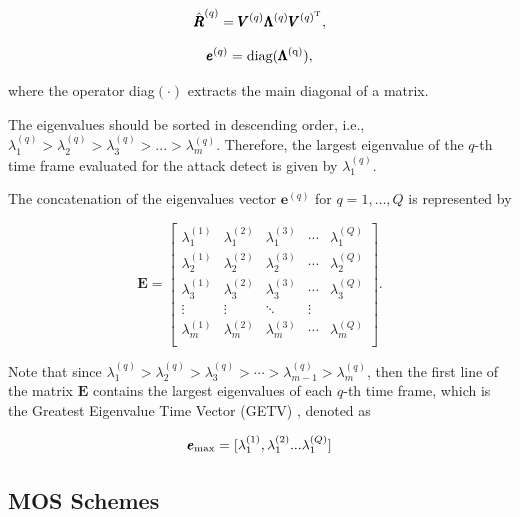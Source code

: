 \begin{equation}\label{eq:2.06}
\hat{\pmb{R}}^{(q)} = \pmb{V}^{(q)}\pmb{\Lambda}^{(q)}\pmb{V}^{(q)^{\rm T}},
\end{equation}

\begin{equation}\label{eq:2.060}
\pmb{e}^{(q)} = \rm diag(\pmb{\Lambda}^{(q)}),
\end{equation}

where the operator diag$(\cdot)$ extracts the main diagonal of a matrix.

The eigenvalues should be sorted in descending order, i.e., $\lambda_{1}^{(q)} > \lambda_{2}^{(q)} > \lambda_{3}^{(q)} > ... > \lambda_{m}^{(q)}$. Therefore, the largest eigenvalue of the $q$-th time frame evaluated for the attack detect is given by $\lambda_{1}^{(q)}$.

The concatenation of the eigenvalues vector $\pmb{e}^{(q)}$ for $q = 1, \ldots, Q$ is represented by

\begin{equation}\label{eq:2.07}
\pmb{E} =
\begin{bmatrix}
  \lambda_1^{(1)} & \lambda_1^{(2)} & \lambda_1^{(3)} & \cdots & \lambda_1^{(Q)} \\
  \lambda_2^{(1)} & \lambda_2^{(2)} & \lambda_2^{(3)} & \cdots & \lambda_2^{(Q)} \\
  \lambda_3^{(1)} & \lambda_3^{(2)} & \lambda_3^{(3)} & \cdots & \lambda_3^{(Q)} \\
  \vdots & \vdots & \ddots & \vdots  \\
  \lambda_m^{(1)} & \lambda_m^{(2)} & \lambda_m^{(3)} & \cdots & \lambda_m^{(Q)} \\
\end{bmatrix}.
\end{equation}

Note that since $\lambda_1^{(q)} > \lambda_2^{(q)} > \lambda_3^{(q)} > \cdots > \lambda_{m-1}^{(q)} > \lambda_m^{(q)}$, then the first line of the matrix $\pmb{E}$ contains the largest eigenvalues of each $q$-th time frame, which is the Greatest Eigenvalue Time
Vector (GETV) \cite{tenorio2013greatest}, denoted as 

\begin{equation}\label{eq:2.08}
\pmb{e}_{\rm max} = [ \lambda_1^{(1)}, \lambda_1^{(2)} ... \lambda_1^{(Q)}]
\end{equation}

\subsection{MOS Schemes}
\label{sec:2_prop_MOSSchemes}

